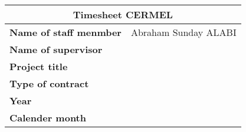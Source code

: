 \documentclass[a4paper,12pt,oneside, landscape]{article}\usepackage[]{graphicx}\usepackage[]{color}
\begin{document}



\begin{tabular}{|l|*{19}{c|}}
 \hline
\multicolumn{20}{|c|}{\textbf{\Large{Timesheet CERMEL}}}\\
\hline
\textbf{Name of staff menmber}&\multicolumn{19}{l|}{Abraham Sunday ALABI}\\
\hline
\textbf{Name of supervisor}&\multicolumn{19}{c|}{}\\
\hline
\textbf{Project title}&\multicolumn{19}{c|}{}\\
\hline
\textbf{Type of contract}&\multicolumn{19}{c|}{}\\
\hline
\textbf{Year}&\multicolumn{19}{c|}{}\\
\hline
\textbf{Calender month}&\multicolumn{19}{c|}{}\\
\hline
\end{tabular}

\end{document}
